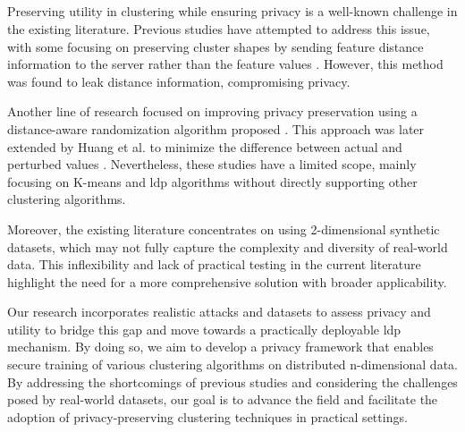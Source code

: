 \newpage

\subsection*{}
Preserving utility in clustering while ensuring privacy is a well-known challenge in the existing literature.
Previous studies have attempted to address this issue, with some focusing on preserving cluster shapes by sending feature distance information to the server rather than the feature values \citep{sun_distributed_2019}.
However, this method was found to leak distance information, compromising privacy.

Another line of research focused on improving privacy preservation using a distance-aware randomization algorithm proposed \citep{xia_distributed_2020}.
This approach was later extended by Huang et al. to minimize the difference between actual and perturbed values \citep{9679364}.
Nevertheless, these studies have a limited scope, mainly focusing on K-means and \gls{ldp} algorithms without directly supporting other clustering algorithms.

Moreover, the existing literature concentrates on using 2-dimensional synthetic datasets, which may not fully capture the complexity and diversity of real-world data.
This inflexibility and lack of practical testing in the current literature highlight the need for a more comprehensive solution with broader applicability.

Our research incorporates realistic attacks and datasets to assess privacy and utility to bridge this gap and move towards a practically deployable \gls{ldp} mechanism.
By doing so, we aim to develop a privacy framework that enables secure training of various clustering algorithms on distributed n-dimensional data.
By addressing the shortcomings of previous studies and considering the challenges posed by real-world datasets, our goal is to advance the field and facilitate the adoption of privacy-preserving clustering techniques in practical settings.

